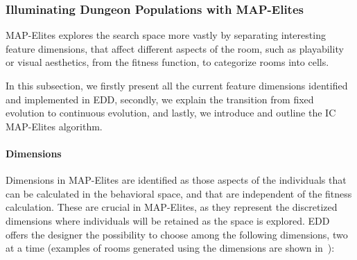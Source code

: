 
\subsubsection{Illuminating Dungeon Populations with MAP-Elites}

MAP-Elites explores the search space more vastly by separating interesting feature dimensions, that affect different aspects of the room, such as playability or visual aesthetics, from the fitness function, to categorize rooms into cells. %

In this subsection, we firstly present all the current feature dimensions identified and implemented in EDD, secondly, we explain the transition from fixed evolution to continuous evolution, and lastly, we introduce and outline the IC MAP-Elites algorithm.

\paragraph{Dimensions}\label{sec:dimensions}
%
Dimensions in MAP-Elites are identified as those aspects of the individuals that can be calculated in the behavioral space, and that are independent of the fitness calculation. These are crucial in MAP-Elites, as they represent the discretized dimensions where individuals will be retained as the space is explored. %
EDD offers the designer the possibility to choose among the following dimensions, two at a time (examples of rooms generated using the dimensions are shown in~):

